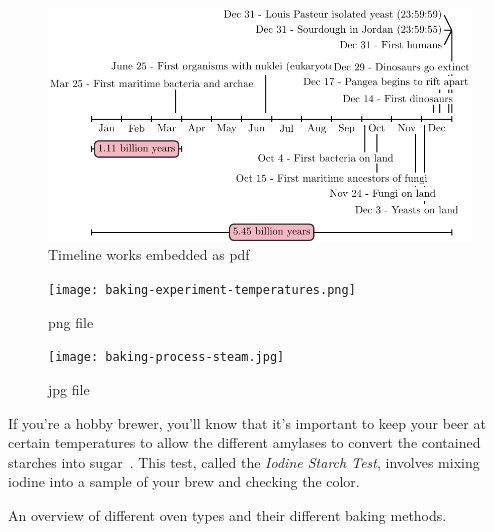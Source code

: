 \documentclass[paper=a4, twoside=false, fontsize=12pt, parskip=half,
                bibliography=totoc, listof=totoc]{scrbook}
\begin{document}
\begin{figure}[!htb]
  \includegraphics{figures/fig-life-planet-sourdough-timeline-external.pdf}
  \caption[Sourdough microbiology timeline]{Timeline works embedded as pdf}%
\end{figure}

\begin{figure}[!htb]
  \texttt{[image: baking-experiment-temperatures.png]}
  \caption[Surface temperature for different steaming methods]{png file}
\end{figure}

\begin{figure}[!htb]
  \texttt{[image: baking-process-steam.jpg]}
  \caption[Steam building with inverted tray]{jpg file}%
      \label{flc:inverted-tray}
\end{figure}
If you're a hobby brewer, you'll know that it's important to keep your beer at
certain temperatures to allow the different amylases to convert the contained
starches into sugar~\cite{beer+amylase}.
This test, called the \emph{Iodine Starch Test}, involves mixing iodine into
a sample of your brew and checking the color.

\begin{table}[!htb]
    \begin{center}
        
        \caption[Different oven types]{An overview of different oven types and their
            different baking methods.}
    \end{center}
\end{table}
{%
\hypersetup{hidelinks}
\listofflowcharts
\listoftables
\listoffigures
}
\printbibliography
\end{document}
